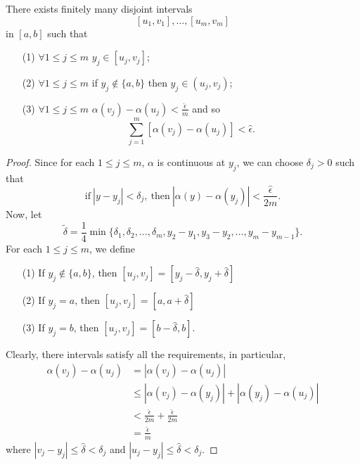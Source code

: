 \begin{lemma}\label{Claim 1}
   There exists finitely many disjoint intervals 
   \[  [{u}_{1}, {v}_{1}], \dots, [{u}_{m}, {v}_{m}] \]
   in \( [a,b] \) such that
   \begin{enumerate}
       \item[(1)] \( \forall 1 \leq j \leq m  \) \( {y}_{j} \in [{u}_{j}, {v}_{j}] \);
        \item[(2)] \( \forall 1 \leq j \leq m  \) if \( {y}_{j} \notin \{ a,b \}  \) then \( {y}_{j} \in ({u}_{j}, {v}_{j}) \);
        \item[(3)] \( \forall  1 \leq j \leq m  \) \( \alpha({v}_{j}) - \alpha({u}_{j}) < \frac{ \hat{\epsilon} }{ m }  \) and so 
            \[  \sum_{ j=1  }^{ m } [\alpha({v}_{j}) - \alpha({u}_{j})] < \hat{\epsilon}. \]
   \end{enumerate}
\end{lemma}
\begin{proof}
Since for each \( 1 \leq j \leq m  \), \( \alpha \) is continuous at \( {y}_{j} \), we can choose \( {\delta}_{j} > 0  \) such that  
\[  \text{if} \ | y  - {y}_{j} |  < {\delta}_{j} , \ \text{then} \ | \alpha(y) - \alpha({y}_{j}) | < \frac{ \hat{\epsilon} }{ 2 m }. \]
Now, let 
\[  \tilde{\delta} = \frac{ 1 }{ 4 }  \min \{ {\delta}_{1}, {\delta}_{2}, \dots, {\delta}_{m}, {y}_{2} - {y}_{1}, {y}_{3} - {y}_{2}, \dots, {y}_{m} - {y}_{m-1} \}. \]
For each \( 1 \leq j \leq m  \), we define
\begin{enumerate}
    \item[(1)] If \( {y}_{j} \notin \{ a,b \}  \), then \( [{u}_{j}, {v}_{j}] = [{y}_{j} - \hat{\delta}, {y}_{j} + \hat{\delta}] \)
    \item[(2)] If \( {y}_{j} = a \), then \( [{u}_{j}, {v}_{j}] = [a, a + \hat{\delta}] \)
    \item[(3)] If \( {y}_{j} = b  \), then \( [{u}_{j}, {v}_{j}] = [b - \hat{\delta}, b ] \).
\end{enumerate}
Clearly, there intervals satisfy all the requirements, in particular, 
\begin{align*}
    \alpha({v}_{j}) - \alpha({u}_{j}) &= | \alpha({v}_{j}) - \alpha({u}_{j}) |  \\
                                      &\leq | \alpha({v}_{j}) - \alpha({y}_{j}) | + | \alpha({y}_{j}) - \alpha({u}_{j}) |  \\
                                      &< \frac{ \hat{\epsilon} }{ 2m }  + \frac{ \hat{\epsilon} }{ 2m }  \\
                                      &= \frac{ \hat{\epsilon} }{ m }
\end{align*}
where \( | {v}_{j} - {y}_{j} | \leq \hat{\delta} < {\delta}_{j} \) and \( | {u}_{j} - {y}_{j} |  \leq \hat{\delta} < {\delta}_{j} \).
\end{proof}

